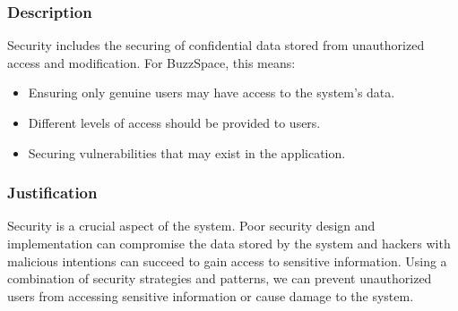\subsubsection*{Description}
	Security includes the securing of confidential data stored from unauthorized access and modification. For BuzzSpace, this means:
	\begin{itemize}
		\item Ensuring only genuine users may have access to the system’s data. 
		\item Different levels of access should be provided to users.
		\item Securing vulnerabilities that may exist in the application.
	\end{itemize}	
	\subsubsection*{Justification}
	 Security is a crucial aspect of the system. Poor security design and implementation can compromise the data stored by the system and hackers with malicious intentions can succeed to gain access to sensitive information. Using a combination of security strategies and patterns, we can prevent unauthorized users from accessing sensitive information or cause damage to the system.
